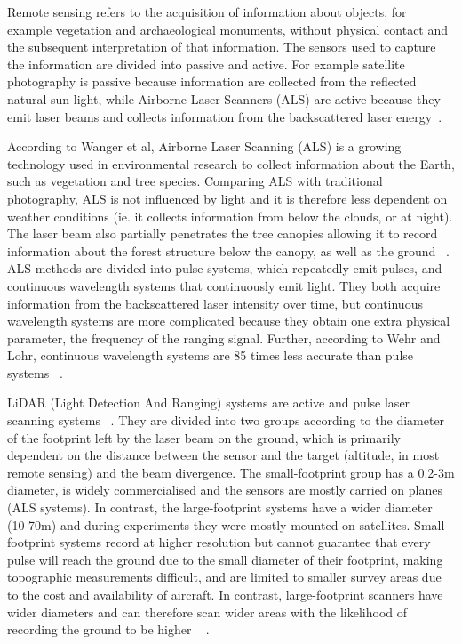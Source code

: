 \documentclass{subfiles}
\begin{document}
	\par Remote sensing refers to the acquisition of information about objects, for example vegetation and archaeological monuments, without physical contact and the subsequent interpretation of that information.  The sensors used to capture the information are divided into passive and active. For example satellite photography is passive because information are collected from the reflected natural sun light, while Airborne Laser Scanners (ALS) are active because they emit laser beams and collects information from the backscattered laser energy~\cite{Smith2012}.
	
	\par According to Wanger et al, Airborne Laser Scanning (ALS) is a growing technology used in environmental research to collect information about the Earth, such as vegetation and tree species. Comparing ALS with traditional photography, ALS is not influenced by light and it is therefore less dependent on weather conditions (ie. it collects information from below the clouds, or at night). The laser beam also partially penetrates the tree canopies allowing it to record information about the forest structure below the canopy, as well as the ground ~\cite{Wanger2004}. ALS methods are divided into pulse systems, which repeatedly emit pulses, and continuous wavelength systems that continuously emit light. They both acquire information from the backscattered laser intensity over time, but continuous wavelength systems are more complicated because they obtain one extra physical parameter, the frequency of the ranging signal. Further, according to Wehr and Lohr, continuous wavelength systems are 85 times less accurate than pulse systems ~\cite{Wehr1999}.
	
	\par LiDAR (Light Detection And Ranging) systems are active and pulse laser scanning systems ~\cite{Wehr1999}. They are divided into two groups according to the diameter of the footprint left by the laser beam on the ground, which is primarily dependent on the distance between the sensor and the target (altitude, in most remote sensing) and the beam divergence. The small-footprint group has a 0.2-3m diameter, is widely commercialised and the sensors are mostly carried on planes (ALS systems). In contrast, the large-footprint systems have a wider diameter (10-70m) and during experiments they were mostly mounted on satellites. Small-footprint systems record at higher resolution but cannot guarantee that every pulse will reach the ground due to the small diameter of their footprint, making topographic measurements difficult, and are limited to smaller survey areas due to the cost and availability of aircraft. In contrast, large-footprint scanners have wider diameters and can therefore scan wider areas with the likelihood of recording the ground to be higher ~\cite{Mallet2009} . 
	
\end{document}
